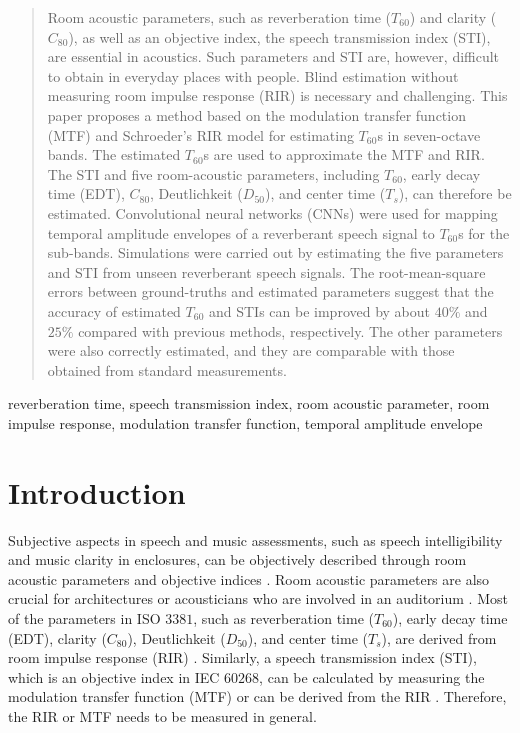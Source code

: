 \documentclass[conference]{IEEEtran}
\begin{document}
	\begin{abstract}
		Room acoustic parameters, such as reverberation time ($T_{60}$) and clarity ($C_{80}$), as well as an objective index, the speech transmission index (STI), are essential in acoustics. Such parameters and STI are, however, difficult to obtain in everyday places with people. Blind estimation without measuring room impulse response (RIR) is necessary and challenging. This paper proposes a method based on the modulation transfer function (MTF) and Schroeder's RIR model for estimating $T_{60}$s in seven-octave bands. 
		The estimated $T_{60}$s are used to approximate the MTF and RIR. The STI and five room-acoustic parameters, including $T_{60}$, early decay time (EDT), $C_{80}$, Deutlichkeit ($D_{50}$), and center time ($T_s$), can therefore be estimated. Convolutional neural networks (CNNs) were used for mapping temporal amplitude envelopes of a reverberant speech signal to $T_{60}$s for the sub-bands. Simulations were carried out by estimating the five parameters and STI from unseen reverberant speech signals. The root-mean-square errors between ground-truths and estimated parameters suggest that the accuracy of estimated $T_{60}$ and STIs can be improved by about $40\%$ and $25\%$ compared with previous methods, respectively. The other parameters were also correctly estimated, and they are comparable with those obtained from standard measurements.
	\end{abstract}
	
	\begin{IEEEkeywords}
		reverberation time, speech transmission index, room acoustic parameter, room impulse response, modulation transfer function, temporal amplitude envelope
	\end{IEEEkeywords}
	
	\section{Introduction}
	Subjective aspects in speech and music assessments, such as speech intelligibility and music clarity in enclosures, can be objectively described through room acoustic parameters and objective indices \cite{Kuttruff}. Room acoustic parameters are also crucial for architectures or acousticians who are involved in an auditorium \cite{AIJ}. Most of the parameters in ISO $3381$, such as reverberation time ($T_{60}$), early decay time (EDT), clarity ($C_{80}$), Deutlichkeit ($D_{50}$), and center time ($T_s$), are derived from room impulse response (RIR) \cite{ISO3381}. Similarly, a speech transmission index (STI), which is an objective index in IEC $60268$, can be calculated by measuring the modulation transfer function (MTF) or can be derived from the RIR \cite{Houtgast_Steeneken_MTF,IEC60268_STI}. Therefore, the RIR or MTF needs to be measured in general.
	
\end{document}
